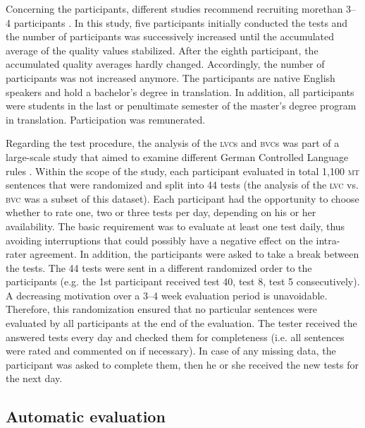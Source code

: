 \documentclass[output=paper]{langsci/langscibook}
\begin{document}
Concerning the participants, different studies recommend recruiting more\linebreak than 3--4 participants \citep{Fiederer2009}. In this study, five participants initially conducted the tests and the number of participants was successively increased until the accumulated average of the quality values stabilized. After the eighth participant, the accumulated quality averages hardly changed. Accordingly, the number of participants was not increased anymore. The participants are native English speakers and hold a bachelor’s degree in translation. In addition, all participants were students in the last or penultimate semester of the master’s degree program in translation. Participation was remunerated.

Regarding the test procedure, the analysis of the \textsc{lvc}s and \textsc{bvc}s was part of a large-scale study that aimed to examine different German Controlled Language rules \citep{Marzouk2019}. Within the scope of the study, each participant evaluated in total 1,100 \textsc{mt} sentences that were randomized and split into 44 tests (the analysis of the \textsc{lvc} vs. \textsc{bvc} was a subset of this dataset). Each participant had the opportunity to choose whether to rate one, two or three tests per day, depending on his or her availability. The basic requirement was to evaluate at least one test daily, thus avoiding interruptions that could possibly have a negative effect on the intra-rater agreement. In addition, the participants were asked to take a break between the tests. The 44 tests were sent in a different randomized order to the participants (e.g. the 1st participant received test 40, test 8, test 5 consecutively). A decreasing motivation over a 3--4 week evaluation period is unavoidable. Therefore, this randomization ensured that no particular sentences were evaluated by all participants at the end of the evaluation. The tester received the answered tests every day and checked them for completeness (i.e. all sentences were rated and commented on if necessary). In case of any missing data, the participant was asked to complete them, then he or she received the new tests for the next day.

\subsection{Automatic evaluation}\largerpage
\end{document}
